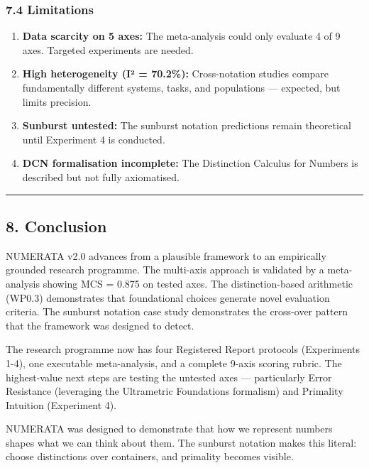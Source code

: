 \documentclass[
]{article}
\providecommand{\tightlist}{%
  \setlength{\itemsep}{0pt}\setlength{\parskip}{0pt}}
\begin{document}
\subsubsection{7.4 Limitations}\label{limitations}

\begin{enumerate}
\def\labelenumi{\arabic{enumi}.}
\tightlist
\item
  \textbf{Data scarcity on 5 axes:} The meta-analysis could only
  evaluate 4 of 9 axes. Targeted experiments are needed.
\item
  \textbf{High heterogeneity (I² = 70.2\%):} Cross-notation studies
  compare fundamentally different systems, tasks, and populations ---
  expected, but limits precision.
\item
  \textbf{Sunburst untested:} The sunburst notation predictions remain
  theoretical until Experiment 4 is conducted.
\item
  \textbf{DCN formalisation incomplete:} The Distinction Calculus for
  Numbers is described but not fully axiomatised.
\end{enumerate}

\begin{center}\rule{0.5\linewidth}{0.5pt}\end{center}

\subsection{8. Conclusion}\label{conclusion}

NUMERATA v2.0 advances from a plausible framework to an empirically
grounded research programme. The multi-axis approach is validated by a
meta-analysis showing MCS = 0.875 on tested axes. The distinction-based
arithmetic (WP0.3) demonstrates that foundational choices generate novel
evaluation criteria. The sunburst notation case study demonstrates the
cross-over pattern that the framework was designed to detect.

The research programme now has four Registered Report protocols
(Experiments 1-4), one executable meta-analysis, and a complete 9-axis
scoring rubric. The highest-value next steps are testing the untested
axes --- particularly Error Resistance (leveraging the Ultrametric
Foundations formalism) and Primality Intuition (Experiment 4).

NUMERATA was designed to demonstrate that how we represent numbers
shapes what we can think about them. The sunburst notation makes this
literal: choose distinctions over containers, and primality becomes
visible.
\end{document}
